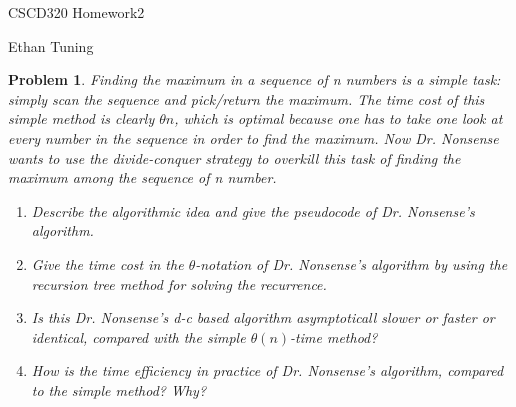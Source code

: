 \documentclass[11pt]{article}
\newtheorem{problem}{Problem}
\begin{document}
	
\begin{center}
{\LARGE CSCD320 Homework2}
		
\bigskip
		
{\Large Ethan Tuning}
\end{center}
	
\bigskip

\begin{problem}
\label{prob:1}
 Finding the maximum in a sequence of n numbers is a simple task: simply scan the sequence and pick/return the maximum. The time cost of this simple method is clearly $\theta{n}$, which is optimal because one has to take one look at every number in the sequence in order to find the maximum. Now Dr. Nonsense wants to use the divide-conquer strategy to overkill this task of finding the maximum among the sequence of n number.
 
\begin{enumerate}
 \item Describe the algorithmic idea and give the pseudocode   of Dr. Nonsense's algorithm.
 \item Give the time cost in the $\theta$-notation of Dr. Nonsense's algorithm by using the recursion tree method for solving the recurrence.
 \item Is this Dr. Nonsense's d-c based algorithm asymptoticall slower or faster or identical, compared with the simple $\theta{(n)}$-time method?
 \item How is the time efficiency in practice of Dr. Nonsense's algorithm, compared to the simple method? Why?
\end{enumerate}

\end{problem}
\end{document}
